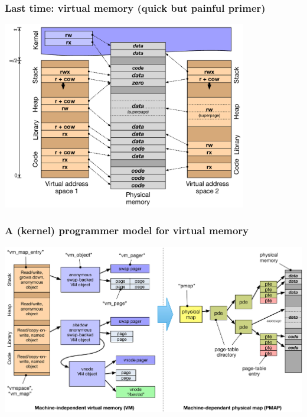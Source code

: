 \begin{frame}
  \frametitle{Last time: virtual memory (quick but painful primer)}

  \begin{center}
    \includegraphics[width=0.8\textwidth]{../../figures/process-address-space.pdf}
  \end{center}
\end{frame}

\begin{frame}
  \frametitle{A (kernel) programmer model for virtual memory}

  \includegraphics[width=\textwidth]{../../figures/mach-vm-model.pdf}
\end{frame}

%
%

